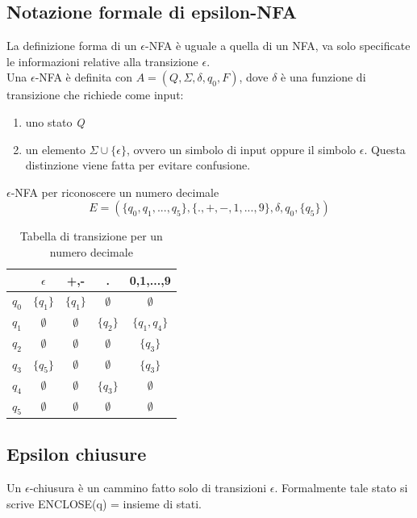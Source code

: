 \documentclass[12pt]{article}
\begin{document}
	\newpage
	\subsection{Notazione formale di epsilon-NFA}
	La definizione forma di un $\epsilon$-NFA è uguale a quella di un NFA, va solo specificate le informazioni relative alla transizione $\epsilon$.
	\\ Una $\epsilon$-NFA è definita con $A = (Q, \Sigma, \delta, q_0, F)$, dove $\delta$ è una funzione di transizione che richiede come input:
	\begin{enumerate}
		\item uno stato \emph{Q}
		\item un elemento $\Sigma \cup \{\epsilon\}$, ovvero un simbolo di input oppure il simbolo $\epsilon$. Questa distinzione viene fatta per evitare confusione.
	\end{enumerate}

$\epsilon$-NFA per riconoscere un numero decimale
	\[ E = (\{q_0,q_1,...,q_5\}, \{.,+,-,1,...,9\},\delta, q_0, \{q_5\})\]

	\begin{table}[ht]
		\centering
		\begin{tabular}{c || c | c | c | c}
			      & $\epsilon$  & +,-         & .           & 0,1,...,9      \\
			\hline \hline
			$q_0$ & $\{q_1\}$   & $\{q_1\}$   & $\emptyset$ & $\emptyset$    \\
			$q_1$ & $\emptyset$ & $\emptyset$ & $\{q_2\}$   & $\{q_1, q_4\}$ \\
			$q_2$ & $\emptyset$ & $\emptyset$ & $\emptyset$ & $\{q_3\}$      \\
			$q_3$ & $\{q_5\}$   & $\emptyset$ & $\emptyset$ & $\{q_3\}$      \\
			$q_4$ & $\emptyset$ & $\emptyset$ & $\{q_3\}$   & $\emptyset$    \\
			$q_5$ & $\emptyset$ & $\emptyset$ & $\emptyset$ & $\emptyset$    \\
		\end{tabular}
		\caption{Tabella di transizione per un numero decimale}
	\end{table}

	\subsection{Epsilon chiusure}
	Un $\epsilon$-chiusura è un cammino fatto solo di transizioni $\epsilon$. Formalmente tale stato si scrive ENCLOSE(q) = {insieme di stati.}
\end{document}
